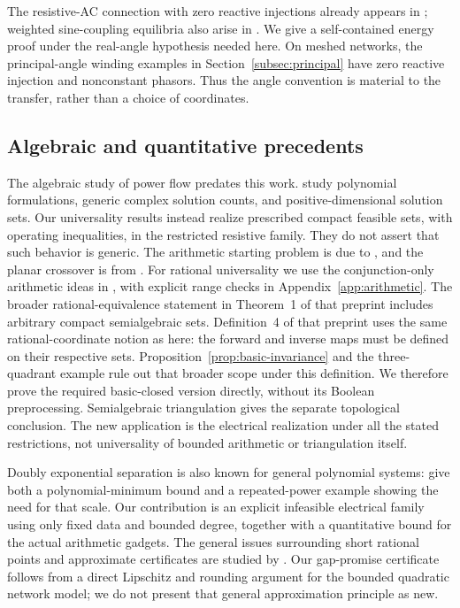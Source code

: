 The resistive-AC connection with zero reactive injections already appears in
\citet[Appendix B, Case 2]{LavaeiLow2012}; weighted sine-coupling equilibria
also arise in \citet{DorflerEtAl2013}. We give a self-contained energy proof
under the real-angle hypothesis needed here. On meshed networks, the
principal-angle winding examples in Section~\ref{subsec:principal} have
zero reactive injection and nonconstant phasors. Thus the angle convention
is material to the transfer, rather than a choice of coordinates.

\subsection{Algebraic and quantitative precedents}

The algebraic study of power flow predates this work.
\citet{MarecekEtAl2016} study polynomial formulations, generic complex
solution counts, and positive-dimensional solution sets. Our universality
results instead realize prescribed compact feasible sets, with operating
inequalities, in the restricted resistive family. They do not assert that
such behavior is generic. The arithmetic starting problem is due to
\citet{AbrahamsenEtAl2018,AbrahamsenEtAl2022}, and the planar crossover is
from \citet{DobbinsEtAl2023}. For rational universality we use the
conjunction-only arithmetic ideas in \citet{AbrahamsenMiltzow2019}, with
explicit range checks in Appendix~\ref{app:arithmetic}. The broader
rational-equivalence statement in Theorem~1 of that preprint includes
arbitrary compact semialgebraic sets. Definition~4 of that preprint uses
the same rational-coordinate notion as here: the forward and inverse maps
must be defined on their respective sets. Proposition~\ref{prop:basic-invariance}
and the three-quadrant example rule out that broader scope under this
definition. We therefore prove the required
basic-closed version directly, without its Boolean preprocessing.
Semialgebraic triangulation \citep{OhmotoShiota2017} gives the separate
topological conclusion. The new application is the electrical realization
under all the stated restrictions, not universality of bounded arithmetic
or triangulation itself.

Doubly exponential separation is also known for general polynomial systems:
\citet{JeronimoEtAl2013} give both a polynomial-minimum bound and a
repeated-power example showing the need for that scale. Our contribution
is an explicit infeasible electrical family using only fixed data and
bounded degree, together with a quantitative bound for the actual
arithmetic gadgets. The general issues surrounding short rational points
and approximate certificates are studied by
\citet{BienstockDelPiaHildebrand2023}. Our gap-promise certificate follows
from a direct Lipschitz and rounding argument for the bounded quadratic
network model; we do not present that general approximation principle as
new.

